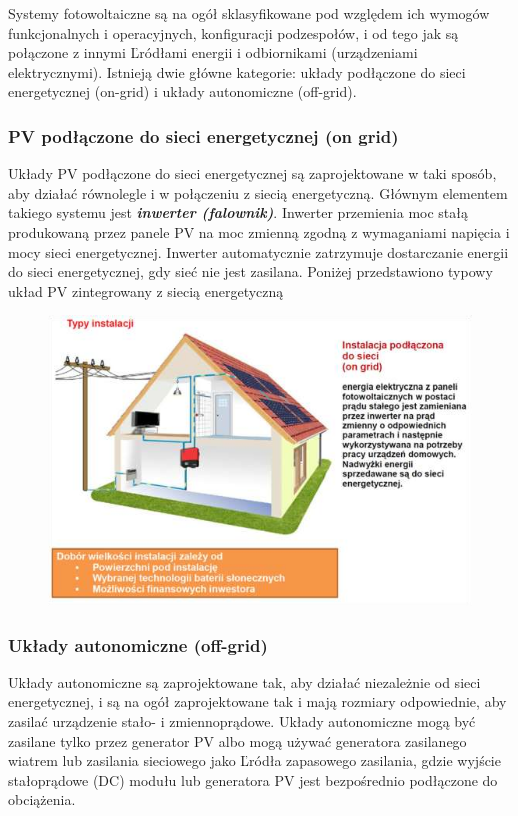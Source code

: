 \documentclass[12pt,a4paper]{article}
\begin{document}
Systemy fotowoltaiczne są na ogół sklasyfikowane pod względem ich 
wymogów funkcjonalnych i operacyjnych, konfiguracji podzespołów, i od 
tego jak są połączone z innymi Ľródłami energii i odbiornikami 
(urządzeniami elektrycznymi). Istnieją dwie główne kategorie: układy 
podłączone do sieci energetycznej (on-grid) i układy autonomiczne (off-grid). 

\subsubsection{PV podłączone do sieci energetycznej (on grid) }

Układy PV podłączone do sieci energetycznej są zaprojektowane w taki 
sposób, aby działać równolegle i w połączeniu z siecią energetyczną. 
Głównym elementem takiego systemu jest \textit{\textbf{inwerter (falownik)}}. Inwerter 
przemienia moc stałą produkowaną przez panele PV na moc zmienną zgodną z 
wymaganiami napięcia i mocy sieci energetycznej. Inwerter automatycznie 
zatrzymuje dostarczanie energii do sieci energetycznej, gdy sieć nie 
jest zasilana. Poniżej przedstawiono typowy układ PV zintegrowany z 
siecią energetyczną 

\begin{figure}[h]
\centering
 	\includegraphics[natwidth=14.41cm,natheight=9.89cm]{media/image3.png}
\end{figure}

\subsubsection{Układy autonomiczne (off-grid)} 
Układy autonomiczne są zaprojektowane tak, aby działać niezależnie od 
sieci energetycznej, i są na ogół zaprojektowane tak i mają rozmiary 
odpowiednie, aby zasilać urządzenie stało- i zmiennoprądowe. Układy autonomiczne mogą być zasilane tylko przez 
generator PV albo mogą używać generatora zasilanego wiatrem lub 
zasilania sieciowego jako Ľródła zapasowego zasilania, gdzie wyjście 
stałoprądowe (DC) modułu lub generatora PV jest bezpośrednio podłączone 
do obciążenia. 
\end{document}
